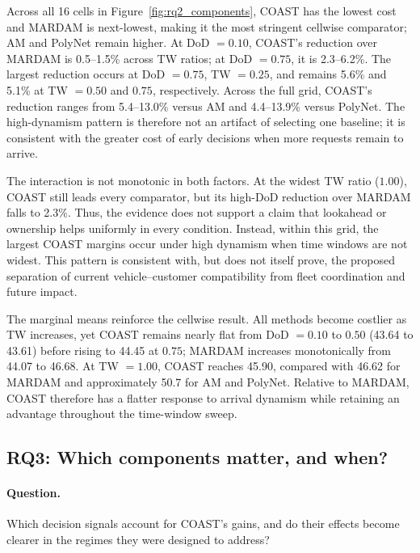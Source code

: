 \documentclass[letterpaper]{article}
\begin{document}
Across all 16 cells in Figure~\ref{fig:rq2_components}, COAST has the lowest cost and MARDAM is next-lowest, making it the most stringent cellwise comparator; AM and PolyNet remain higher. At DoD $=0.10$, COAST's reduction over MARDAM is 0.5--1.5\% across TW ratios; at DoD $=0.75$, it is 2.3--6.2\%. The largest reduction occurs at DoD $=0.75$, TW $=0.25$, and remains 5.6\% and 5.1\% at TW $=0.50$ and $0.75$, respectively. Across the full grid, COAST's reduction ranges from 5.4--13.0\% versus AM and 4.4--13.9\% versus PolyNet. The high-dynamism pattern is therefore not an artifact of selecting one baseline; it is consistent with the greater cost of early decisions when more requests remain to arrive.

The interaction is not monotonic in both factors. At the widest TW ratio ($1.00$), COAST still leads every comparator, but its high-DoD reduction over MARDAM falls to 2.3\%. Thus, the evidence does not support a claim that lookahead or ownership helps uniformly in every condition. Instead, within this grid, the largest COAST margins occur under high dynamism when time windows are not widest. This pattern is consistent with, but does not itself prove, the proposed separation of current vehicle--customer compatibility from fleet coordination and future impact.

The marginal means reinforce the cellwise result. All methods become costlier as TW increases, yet COAST remains nearly flat from DoD $=0.10$ to $0.50$ (43.64 to 43.61) before rising to 44.45 at $0.75$; MARDAM increases monotonically from 44.07 to 46.68. At TW $=1.00$, COAST reaches 45.90, compared with 46.62 for MARDAM and approximately 50.7 for AM and PolyNet. Relative to MARDAM, COAST therefore has a flatter response to arrival dynamism while retaining an advantage throughout the time-window sweep.

\subsection{RQ3: Which components matter, and when?}

\paragraph{Question.} Which decision signals account for COAST's gains, and do their effects become clearer in the regimes they were designed to address?
\end{document}
